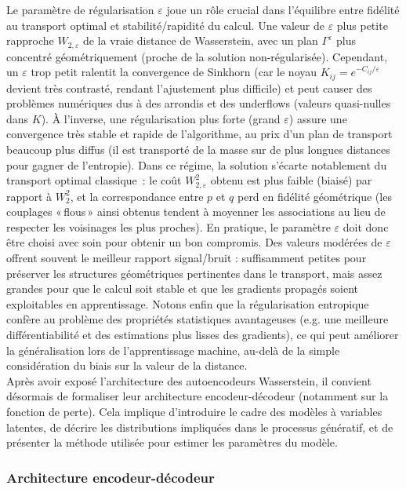 Le paramètre de régularisation $\varepsilon$ joue un rôle crucial dans l’équilibre entre fidélité au transport optimal et stabilité/rapidité du calcul. Une valeur de $\varepsilon$ plus petite rapproche $W_{2,\varepsilon}$ de la vraie distance de Wasserstein, avec un plan $\Gamma^{\varepsilon}$ plus concentré géométriquement (proche de la solution non-régularisée). Cependant, un $\varepsilon$ trop petit ralentit la convergence de Sinkhorn (car le noyau $K_{ij}=e^{-C_{ij}/\varepsilon}$ devient très contrasté, rendant l’ajustement plus difficile) et peut causer des problèmes numériques dus à des arrondis et des underflows (valeurs quasi-nulles dans $K$). À l’inverse, une régularisation plus forte (grand $\varepsilon$) assure une convergence très stable et rapide de l’algorithme, au prix d’un plan de transport beaucoup plus diffus (il est transporté de la masse sur de plus longues distances pour gagner de l’entropie). Dans ce régime, la solution s’écarte notablement du transport optimal classique : le coût $W_{2,\varepsilon}^2$ obtenu est plus faible (biaisé) par rapport à $W_2^2$, et la correspondance entre $p$ et $q$ perd en fidélité géométrique (les couplages « flous » ainsi obtenus tendent à moyenner les associations au lieu de respecter les voisinages les plus proches). En pratique, le paramètre $\varepsilon$ doit donc être choisi avec soin pour obtenir un bon compromis. Des valeurs modérées de $\varepsilon$ offrent souvent le meilleur rapport signal/bruit : suffisamment petites pour préserver les structures géométriques pertinentes dans le transport, mais assez grandes pour que le calcul soit stable et que les gradients propagés soient exploitables en apprentissage. Notons enfin que la régularisation entropique confère au problème des propriétés statistiques avantageuses (e.g. une meilleure différentiabilité et des estimations plus lisses des gradients), ce qui peut améliorer la généralisation lors de l’apprentissage machine, au-delà de la simple considération du biais sur la valeur de la distance.\\

Après avoir exposé l'architecture des autoencodeurs Wasserstein, il convient désormais de formaliser leur architecture encodeur-décodeur (notamment sur la fonction de perte). Cela implique d’introduire le cadre des modèles à variables latentes, de décrire les distributions impliquées dans le processus génératif, et de présenter la méthode utilisée pour estimer les paramètres du modèle.

\subsubsection{Architecture encodeur-décodeur}

